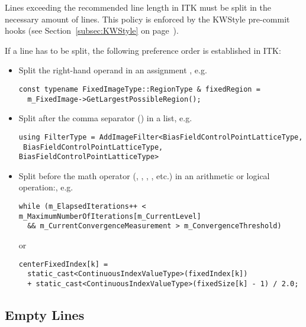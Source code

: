 Lines exceeding the recommended line length in ITK must be split in the
necessary amount of lines. This policy is enforced by the KWStyle pre-commit
hooks (see Section~\ref{subsec:KWStyle} on page~\pageref{subsec:KWStyle}).

If a line has to be split, the following preference order is established in ITK:
\begin{itemize}
\item Split the right-hand operand in an assignment \code{=}, e.g.

\small
\begin{verbatim}
const typename FixedImageType::RegionType & fixedRegion =
  m_FixedImage->GetLargestPossibleRegion();
\end{verbatim}
\normalsize

\item Split after the comma separator (\code{,}) in a list, e.g.

\small
\begin{verbatim}
using FilterType = AddImageFilter<BiasFieldControlPointLatticeType,
 BiasFieldControlPointLatticeType, BiasFieldControlPointLatticeType>
\end{verbatim}
\normalsize

\item Split before the math operator (\code{+}, \code{*}, \code{||}, \code{\&\&},
etc.) in an arithmetic or logical operation:, e.g.

\small
\begin{verbatim}
while (m_ElapsedIterations++ < m_MaximumNumberOfIterations[m_CurrentLevel]
  && m_CurrentConvergenceMeasurement > m_ConvergenceThreshold)
\end{verbatim}
\normalsize

or

\small
\begin{verbatim}
centerFixedIndex[k] =
  static_cast<ContinuousIndexValueType>(fixedIndex[k])
  + static_cast<ContinuousIndexValueType>(fixedSize[k] - 1) / 2.0;
\end{verbatim}
\normalsize

\end{itemize}


\subsection{Empty Lines}
\label{subsec:EmptyLines}

